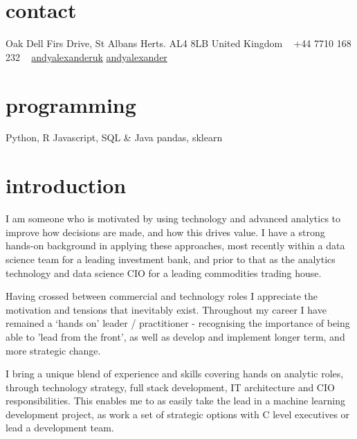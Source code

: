 \documentclass[]{friggeri-cv}
\begin{document}

\begin{aside} %
\section{contact}
Oak Dell
Firs Drive, St Albans
Herts. AL4 8LB
United Kingdom
~
+44 7710 168 232
~
\href{https://www.linkedin.com/in/andyalexanderuk}{\faLinkedinSign {} andyalexanderuk}
\href{https://github.com/andyalexander}{\faGithub {} andyalexander}
\section{programming}
Python, R
Javascript, SQL \& Java
pandas, sklearn    
\end{aside}



\section{introduction}

I am someone who is motivated by using technology and advanced analytics to improve how decisions are made, and how this drives value.  I have a strong hands-on background in applying these approaches, most recently within a data science team for a leading investment bank, and prior to that as the analytics technology and data science CIO for a leading commodities trading house.

Having crossed between commercial and technology roles I appreciate the motivation and tensions that inevitably exist.  Throughout my career I have remained a ‘hands on’ leader / practitioner - recognising the importance of being able to 'lead from the front', as well as develop and implement longer term, and more strategic change.

I bring a unique blend of experience and skills covering hands on analytic roles, through technology strategy, full stack development, IT architecture and CIO responsibilities.  This enables me to as easily take the lead in a machine learning development project, as work a set of strategic options with C level executives or lead a development team.
\end{document}
